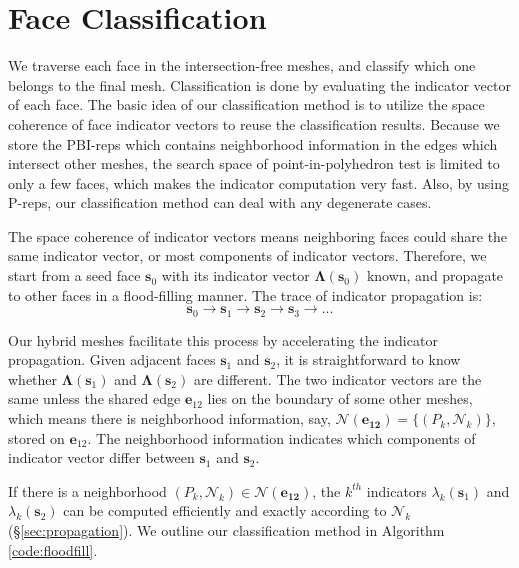 \documentclass[10pt,journal,compsoc]{IEEEtran}
\begin{document}
\section{Face Classification}

\label{sec:classification}
We traverse each face in the intersection-free meshes, and classify which one belongs to the final mesh. Classification is done by evaluating the indicator vector of each face. The basic idea of our classification method is to utilize the space coherence of face indicator vectors to reuse the classification results. Because we store the PBI-reps which contains neighborhood information in the edges which intersect other meshes, the search space of point-in-polyhedron test is limited to only a few faces, which makes the indicator computation very fast. Also, by using P-reps, our classification method can deal with any degenerate cases.


The space coherence of indicator vectors means neighboring faces could share the same indicator vector, or most components of indicator vectors. Therefore, we start from a seed face $\bm{s}_0$ with its indicator vector $\bm{\Lambda}(\bm{s}_0)$ known, and propagate to other faces in a flood-filling manner. The trace of indicator propagation is:
\begin{equation}
\label{eq:trace}
\bm{s}_0\to \bm{s}_1\to \bm{s}_2\to \bm{s}_3\to ...
\end{equation}


Our hybrid meshes facilitate this process by accelerating the indicator propagation. Given adjacent faces $\bm{s}_1$ and $\bm{s}_2$, it is straightforward to know whether $\bm{\Lambda}(\bm{s}_1)$ and $\bm{\Lambda}(\bm{s}_2)$ are different. The two indicator vectors are the same unless the shared edge $\bm{e}_{12}$ lies on the boundary of some other meshes, which means there is neighborhood information, say, $\bm{\mathcal{N}(\bm{e}_{12})} = \{(P_k, \mathcal{N}_k)\}$, stored on $\bm{e}_{12}$. The neighborhood information indicates which components of indicator vector differ between $\bm{s}_1$ and $\bm{s}_2$.

If there is a neighborhood $(P_k, \mathcal{N}_k) \in \bm{\mathcal{N}}(\bm{\bm{e}_{12}})$, the $k^{th}$ indicators $\lambda_k(\bm{s}_1)$ and $\lambda_k(\bm{s}_2)$ can be computed efficiently and exactly according to $\mathcal{N}_k$ (\S\ref{sec:propagation}). We outline our classification method in Algorithm \ref{code:floodfill}.
\end{document}
